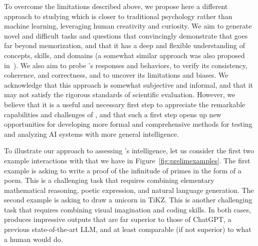 To overcome the limitations described above, we propose here a different approach to studying {\DV} which is closer to traditional psychology rather than machine learning, leveraging human creativity and curiosity. We aim to generate novel and difficult tasks and questions that convincingly demonstrate that {\DV} goes far beyond memorization, and that it has a deep and flexible understanding of concepts, skills, and domains (a somewhat similar approach was also proposed in~\cite{collins2022structured}). We also aim to probe \DV's responses and behaviors, to verify its consistency, coherence, and correctness, and to uncover its limitations and biases. We acknowledge that this approach is somewhat subjective and informal, and that it may not satisfy the rigorous standards of scientific evaluation. However, we believe that it is a useful and necessary first step to appreciate the remarkable capabilities and challenges of \DV, and that such a first step opens up new opportunities for developing more formal and comprehensive methods for testing and analyzing AI systems with more general intelligence. 
\newline

To illustrate our approach to assessing \DV's intelligence, let us consider the first two example interactions with {\DV} that we have in Figure~\ref{fig:prelimexamples}. The first example is asking {\DV} to write a proof of the infinitude of primes in the form of a poem. This is a challenging task that requires combining elementary mathematical reasoning, poetic expression, and natural language generation. The second example is asking {\DV} to draw a unicorn in TiKZ. This is another challenging task that requires combining visual imagination and coding skills. In both cases, {\DV} produces impressive outputs that are far superior to those of ChatGPT, a previous state-of-the-art LLM, and at least comparable (if not superior) to what a human would do. 
\newline

